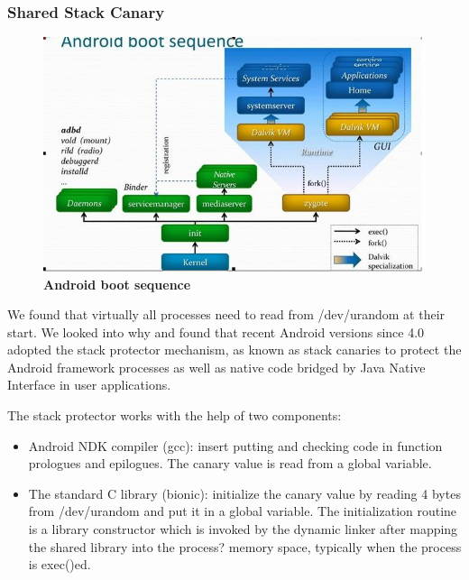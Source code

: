 \subsubsection{Shared Stack Canary}


\begin{figure}[t]
\begin{center}
\includegraphics[natwidth=640mm,natheight=392,scale=.3]{bootseq.png}
\end{center}
\caption{{\bf Android boot sequence}} 
\label{figzygote}
\end{figure}



We found that virtually all processes need to read from /dev/urandom at their start. We looked into why and found that recent Android versions since 4.0 adopted the stack protector mechanism, as known as stack canaries to protect the Android framework processes as well as native code bridged by Java Native Interface in user applications.

The stack protector works with the help of two components:
\begin{itemize}

\item Android NDK compiler (gcc): insert putting and checking code in function prologues and epilogues. The canary value is read from a global variable.
\item The standard C library (bionic): initialize the canary value by reading 4 bytes from /dev/urandom and put it in a global variable. The initialization routine is a library constructor which is invoked by the dynamic linker after mapping the shared library into the process? memory space, typically when the process is exec()ed.
\end{itemize}

